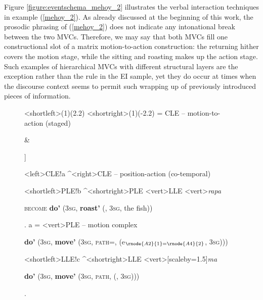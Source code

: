 {Figure \ref{figure:eventschema_mehoy_2} illustrates the verbal interaction techniques in example (\ref{mehoy_2}). As already discussed at the beginning of this work, the prosodic phrasing of (\ref{mehoy_2}) does not indicate any intonational break between the two MVCs. Therefore, we may say that both MVCs fill one constructional slot of a matrix motion-to-action construction: the returning hither covers the motion stage, while the sitting and roasting makes up the action stage. Such examples of hierarchical MVCs with different structural layers are the exception rather than the rule in the EI sample, yet they do occur at times when the discourse context seems to permit such wrapping up of previously introduced pieces of information.

\begin{figure}
\jtree[xunit=12em,yunit=2em]
<shortleft>(1)(2.2)
<shortright>(1)(-2.2)
\! = {CLE -- motion-to-action (staged)}
{\begin{scriptsize} [[ \textbf{do'} (3\textsc{sg}, \textbf{move'} (3\textsc{sg}, \textsc{path=come}, \textbf{return'} (e$_{1=2}$, 3\textsc{sg}))) ] \& \end{scriptsize}}
{\begin{scriptsize} ]\end{scriptsize}}
<left>{CLE}!a ^<right>{CLE -- position-action (co-temporal)}{\begin{scriptsize} \end{scriptsize}}
<shortleft>{PLE}!b ^<shortright>{PLE}
<vert>{LLE}
<vert>{\textit{rapa}}{\begin{scriptsize} \textsc{become} \textbf{do'} (3\textsc{sg}, \textbf{roast'} (, 3\textsc{sg}, the fish))\end{scriptsize}}.
\!a = <vert>{PLE -- motion complex}{\begin{scriptsize} \textbf{do'} (3\textsc{sg}, \textbf{move'} (3\textsc{sg}, \textsc{path=}, \textbf{} (e$_{\rnode{A2}{1}=\rnode{A4}{2}}$, 3\textsc{sg}))) \end{scriptsize}}
<shortleft>{LLE}!c ^<shortright>{LLE}
<vert>[scaleby=1.5]{\textit{ma}}
{\begin{scriptsize} \textbf{do'} (3\textsc{sg}, \textbf{move'} (3\textsc{sg}, \textsc{path}, \textbf{} (, 3\textsc{sg})))\end{scriptsize}}.

\end{figure}}
